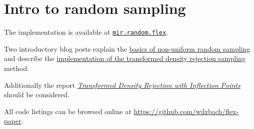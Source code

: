 \section{Intro to random sampling}

The implementation is available at \href{http://docs.mir.dlang.io/mir_random_flex.html}{\texttt{mir.random.flex}}.

Two introductory blog posts explain the \href{http://blog.mir.dlang.io/random/2016/08/19/intro-to-random-sampling.html}{basics of non-uniform random sampling}
and describe the \href{http://blog.mir.dlang.io/random/2016/08/22/transformed-density-rejection-sampling.html}{implementation of the transformed density rejection sampling} method.

Additionally the report \textit{\href{http://epub.wu.ac.at/3158/1/techreport-110.pdf}{Transformed Density Rejection with Inflection Points}}
should be considered.

All code listings can be browsed online at \url{https://github.com/wilzbach/flex-paper}.
